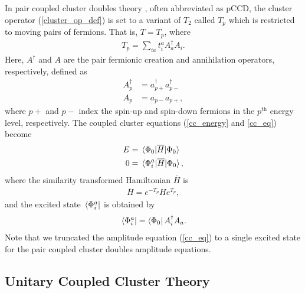\documentclass[Dual]{msu-thesis}
\begin{document}
In pair coupled cluster doubles theory \cite{ref:pccd}, often abbreviated as pCCD, the cluster operator (\ref{cluster_op_def}) is set to a variant of $T_2$ called $T_p$ which is restricted to moving pairs of fermions. That is, $T=T_p$, where
\begin{align}
\label{T_p}
T_p=\sum_{ia}t^a_iA^\dagger_aA_i
.\end{align}
Here, $A^\dagger$ and $A$ are the pair fermionic creation and annihilation operators, respectively, defined as
\begin{align}
\label{pair_op_def}
A^{\dagger}_p &= a^{\dagger}_{p+}a^{\dagger}_{p-}
\\
A_p &= a_{p-}a_{p+}
,\end{align}
where $p+$ and $p-$ index the spin-up and spin-down fermions in the $p^{\text{th}}$ energy level, respectively. The coupled cluster equations (\ref{cc_energy} and \ref{cc_eq}) become
\begin{align}
\label{pccd_energy}
E&=\mel{\Phi_0}{\overline{H}}{\Phi_0}
\\
\label{pccd_eq}
0&=\mel{\Phi_i^a}{\overline{H}}{\Phi_0}
,\end{align}
where the similarity transformed Hamiltonian $\overline{H}$ is
\begin{align}
\overline{H}=e^{-T_p}He^{T_p}
,\end{align}
and the excited state $\bra*{\Phi_i^a}$ is obtained by
\begin{align}
\bra*{\Phi_i^a}=\bra{\Phi_0}A^\dagger_iA_a
.\end{align}
Note that we truncated the amplitude equation (\ref{cc_eq}) to a single excited state for the pair coupled cluster doubles amplitude equations.

\subsection{Unitary Coupled Cluster Theory}
\end{document}
